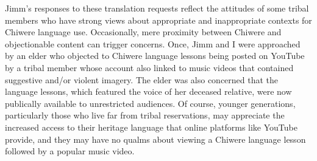 \documentclass[output=paper]{LSP/langsci}
\begin{document}
Jimm's responses to these translation requests reflect the attitudes of some tribal members who have strong views about appropriate and inappropriate contexts for Chiwere language use. Occasionally, mere proximity between Chiwere and objectionable content can trigger concerns. Once, Jimm and I were approached by an elder who objected to Chiwere language lessons being posted on YouTube by a tribal member whose account also linked to music videos that contained suggestive and/or violent imagery. The elder was also concerned that the language lessons, which featured the voice of her deceased relative, were now publically available to unrestricted audiences. Of course, younger generations, particularly those who live far from tribal reservations, may appreciate the increased access to their heritage language that online platforms like YouTube provide, and they may have no qualms about viewing a Chiwere language lesson followed by a popular music video.
\end{document}
